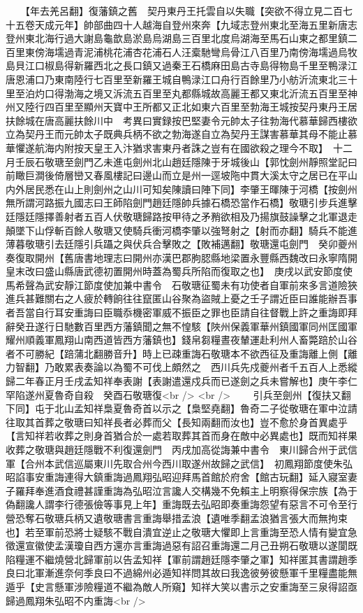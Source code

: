 　　【年去羌呂翻】復藩鎮之舊　契丹東丹王托雲自以失職【突欲不得立見二百七十五卷天成元年】帥部曲四十人越海自登州來奔【九域志登州東北至海五里新唐志登州東北海行過大謝島龜歆島淤島烏湖島三百里北度烏湖海至馬石山東之都里鎮二百里東傍海壖過青泥浦桃花浦杏花浦石人汪槖馳彎烏骨江八百里乃南傍海壖過烏牧島貝江口椒島得新羅西北之長口鎮又過秦王石橋麻田島古寺島得物島千里至鴨渌江唐恩浦口乃東南陸行七百里至新羅王城自鴨渌江口舟行百餘里乃小舫沂流東北三十里至泊灼口得渤海之境又泝流五百里至丸都縣城故高麗王都又東北沂流五百里至神州又陸行四百里至顯州天寶中王所都又正北如東六百里至勃海王城按契丹東丹王居扶餘城在唐高麗扶餘川中　考異曰實録按巴堅妻令元帥太子往勃海代慕華歸西樓欲立為契丹王而元帥太子既典兵柄不欲之勃海遂自立為契丹王謀害慕華其母不能止慕華懼遂航海内附按天皇王入汴猶求害東丹者誅之豈有在國欲殺之理今不取】　十二月壬辰石敬瑭至劍門乙未進屯劍州北山趙廷隱陳于牙城後山【郭忱劍州靜照堂記曰前瞰巨澗後倚層巒又春風樓記曰邊山而立是州一逕坡陁中貫大溪太守之居已在平山内外居民悉在山上則劍州之山川可知矣陳讀曰陣下同】李肇王暉陳于河橋【按劍州無所謂河路振九國志曰王師陷劍門趙廷隱帥兵據石橋恐當作石橋】敬瑭引步兵進擊廷隱廷隱擇善射者五百人伏敬瑭歸路按甲待之矛矟欲相及乃揚旗鼓譟擊之北軍退走顛墜下山俘斬百餘人敬瑭又使騎兵衝河橋李肇以強弩射之【射而亦翻】騎兵不能進薄暮敬瑭引去廷隱引兵躡之與伏兵合擊敗之【敗補邁翻】敬瑭還屯劍門　癸卯夔州奏復取開州【舊唐書地理志曰開州亦漢巴郡胊䏰縣地梁置永豐縣西魏改曰永寧隋開皇末改曰盛山縣唐武德初置開州時蓋為蜀兵所陷而復取之也】　庚戌以武安節度使馬希聲為武安靜江節度使加兼中書令　石敬瑭征蜀未有功使者自軍前來多言道險狹進兵甚難關右之人疲於轉餉往往竄匿山谷聚為盜賊上憂之壬子謂近臣曰誰能辦吾事者吾當自行耳安重誨曰臣職忝機密軍威不振臣之罪也臣請自往督戰上許之重誨即拜辭癸丑遂行日馳數百里西方藩鎮聞之無不惶駭【陜州保義軍華州鎮國軍同州匡國軍耀州順義軍鳳翔山南西道皆西方藩鎮也】錢帛芻糧晝夜輦運赴利州人畜斃踣於山谷者不可勝紀【踣蒲北翻勝音升】時上已疎重誨石敬瑭本不欲西征及重誨離上側【離力智翻】乃敢累表奏論以為蜀不可伐上頗然之　西川兵先戍夔州者千五百人上悉縱歸二年春正月壬戌孟知祥奉表謝【表謝遣還戍兵而已遂劍之兵未嘗解也】庚午李仁罕陷遂州夏魯奇自殺　癸酉石敬瑭復<br />
<br />
　　引兵至劍州【復扶又翻下同】屯于北山孟知祥梟夏魯奇首以示之【梟堅堯翻】魯奇二子從敬瑭在軍中泣請往取其首葬之敬瑭曰知祥長者必葬而父【長知兩翻而汝也】豈不愈於身首異處乎【言知祥若收葬之則身首猶合於一處若取葬其首而身在敵中必異處也】既而知祥果收葬之敬瑭與趙廷隱戰不利復還劍門　丙戌加高從誨兼中書令　東川歸合州于武信軍【合州本武信巡屬東川先取合州今西川取遂州故歸之武信】　初鳳翔節度使朱弘昭諂事安重誨連得大鎮重誨過鳳翔弘昭迎拜馬首館於府舍【館古玩翻】延入寢室妻子羅拜奉進酒食禮甚謹重誨為弘昭泣言讒人交構幾不免賴主上明察得保宗族【為于偽翻讒人謂李行德張儉等事見上年】重誨既去弘昭即奏重誨怨望有惡言不可令至行營恐奪石敬瑭兵柄又遺敬瑭書言重誨舉措孟浪【遺唯季翻孟浪猶言張大而無拘束也】若至軍前恐將士疑駭不戰自潰宜逆止之敬瑭大懼即上言重誨至恐人情有變宜急徵還宣徽使孟漢瓊自西方還亦言重誨過惡有詔召重誨還二月己丑朔石敬瑭以遂閬既陷糧運不繼燒營北歸軍前以告孟知祥【軍前謂趙廷隱李肇之軍】知祥匿其書謂趙季良曰北軍漸進奈何季良曰不過綿州必遁知祥問其故曰我逸彼勞彼懸軍千里糧盡能無遁乎【史言懸軍涉險糧道不繼為敵人所窺】知祥大笑以書示之安重誨至三泉得詔亟歸過鳳翔朱弘昭不内重誨<br />
